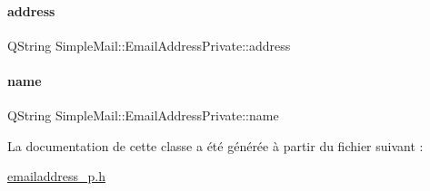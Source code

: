 \paragraph{\texorpdfstring{address}{address}}
{\footnotesize\ttfamily Q\+String Simple\+Mail\+::\+Email\+Address\+Private\+::address}

\mbox{\label{class_simple_mail_1_1_email_address_private_ae60cdddafe1a563cff906aa5896ba3a6}} 
\paragraph{\texorpdfstring{name}{name}}
{\footnotesize\ttfamily Q\+String Simple\+Mail\+::\+Email\+Address\+Private\+::name}



La documentation de cette classe a été générée à partir du fichier suivant \+:\begin{DoxyCompactItemize}
\item 
\hyperlink{emailaddress__p_8h}{emailaddress\+\_\+p.\+h}\end{DoxyCompactItemize}
